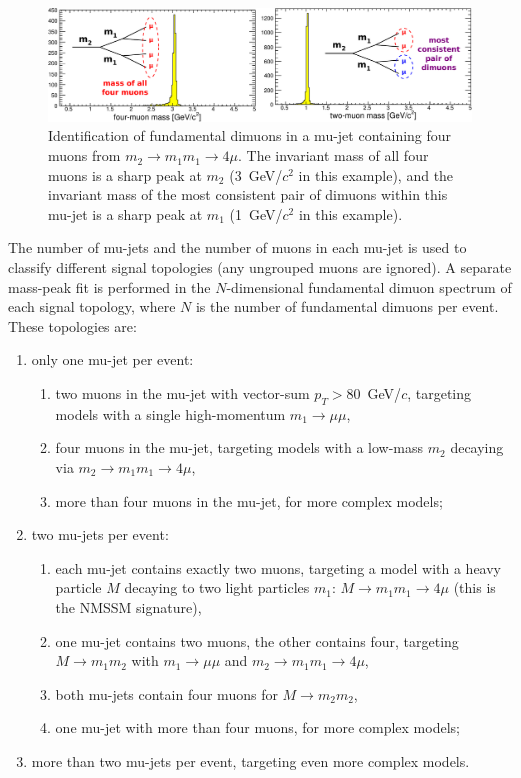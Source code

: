\documentclass[12pt]{cms-tdr}
\begin{document}
\begin{figure}
\includegraphics[width=\linewidth]{PLOTS/four-two-muon-mass}

\caption{Identification of fundamental dimuons in a mu-jet containing
  four muons from $m_2 \to m_1 m_1 \to 4\mu$.  The invariant mass of
  all four muons is a sharp peak at $m_2$ (3~GeV/$c^2$ in this
  example), and the invariant mass of the most consistent pair of
  dimuons within this mu-jet is a sharp peak at $m_1$ (1~GeV/$c^2$ in
  this example). \label{fig:four-two-muon-mass}}
\end{figure}

\label{sec:signal_channels}
The number of mu-jets and the number of muons in each mu-jet is used
to classify different signal topologies (any ungrouped muons are
ignored).  A separate mass-peak fit is performed in the
$N$-dimensional fundamental dimuon spectrum of each signal topology,
where $N$ is the number of fundamental dimuons per event.  These
topologies are:
\begin{enumerate}\renewcommand{\labelenumi}{(\alph{enumi})}
\item only one mu-jet per event:
\begin{enumerate}\renewcommand{\labelenumii}{(a-\arabic{enumii})}
\item two muons in the mu-jet with vector-sum $p_T > 80$~GeV/$c$,
  targeting models with a single high-momentum $m_1 \to \mu\mu$,
\item four muons in the mu-jet, targeting models with a low-mass $m_2$
  decaying via $m_2 \to m_1 m_1 \to 4\mu$,
\item more than four muons in the mu-jet, for more complex
  models;
\end{enumerate}

\item two mu-jets per event:
\begin{enumerate}\renewcommand{\labelenumii}{(b-\arabic{enumii})}
\item each mu-jet contains exactly two muons, targeting a model with a
  heavy particle $M$ decaying to two light particles $m_1$: $M \to m_1
  m_1 \to 4\mu$ (this is the NMSSM signature),
\item one mu-jet contains two muons, the other contains four,
  targeting $M \to m_1 m_2$ with $m_1 \to \mu\mu$ and $m_2 \to m_1 m_1
  \to 4\mu$,
\item both mu-jets contain four muons for $M \to m_2 m_2$,
\item one mu-jet with more than four muons, for more complex
  models;
\end{enumerate}

\item more than two mu-jets per event, targeting even more complex models.
\end{enumerate}
\end{document}
